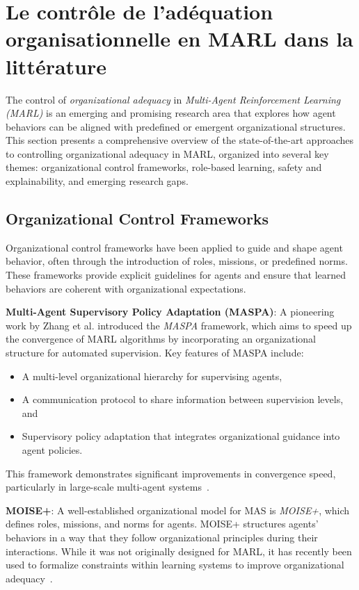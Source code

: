 \documentclass[sigconf,anonymous]{aamas}
\begin{document}
\section{Le contrôle de l'adéquation organisationnelle en MARL dans la littérature}
\label{sec:control_problem}

The control of \textit{organizational adequacy} in \textit{Multi-Agent Reinforcement Learning (MARL)} is an emerging and promising research area that explores how agent behaviors can be aligned with predefined or emergent organizational structures. This section presents a comprehensive overview of the state-of-the-art approaches to controlling organizational adequacy in MARL, organized into several key themes: organizational control frameworks, role-based learning, safety and explainability, and emerging research gaps.

\subsection{Organizational Control Frameworks}

Organizational control frameworks have been applied to guide and shape agent behavior, often through the introduction of roles, missions, or predefined norms. These frameworks provide explicit guidelines for agents and ensure that learned behaviors are coherent with organizational expectations.

\textbf{Multi-Agent Supervisory Policy Adaptation (MASPA)}: A pioneering work by Zhang et al. introduced the \textit{MASPA} framework, which aims to speed up the convergence of MARL algorithms by incorporating an organizational structure for automated supervision. Key features of MASPA include:
\begin{itemize}
    \item A multi-level organizational hierarchy for supervising agents,
    \item A communication protocol to share information between supervision levels, and
    \item Supervisory policy adaptation that integrates organizational guidance into agent policies.
\end{itemize}
This framework demonstrates significant improvements in convergence speed, particularly in large-scale multi-agent systems~\cite{zhang2009maspa}.

\textbf{MOISE+}: A well-established organizational model for MAS is \textit{MOISE+}, which defines roles, missions, and norms for agents. MOISE+ structures agents' behaviors in a way that they follow organizational principles during their interactions. While it was not originally designed for MARL, it has recently been used to formalize constraints within learning systems to improve organizational adequacy~\cite{hubner2002moise}.
\end{document}
